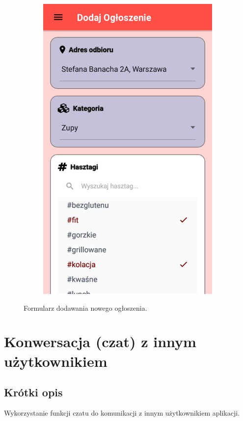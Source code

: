 \documentclass[licencjacka]{pracamgr}
\begin{document}
\begin{figure}[H]
\begin{subfigure}[b]{0.4\linewidth}
\begin{framed}
      \includegraphics[width=\linewidth]{dodawanie2.png}
    \end{framed}
  \end{subfigure}
  \caption{Formularz dodawania nowego ogłoszenia.}
  \label{fig:addoffer}
\end{figure}

\section{Konwersacja (czat) z innym użytkownikiem}
    \subsection{Krótki opis}
    Wykorzystanie funkcji czatu do komunikacji z innym użytkownikiem aplikacji.
\end{document}
